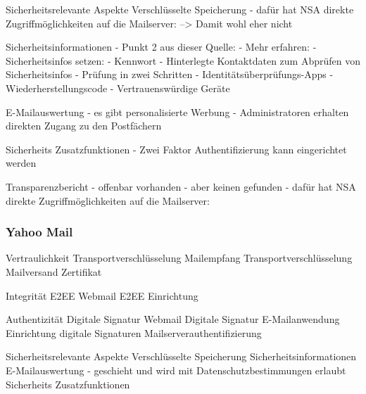 \documentclass  [paper=a4,
				fontsize=12pt,
				listof=totoc,
				bibliography=totoc
				]{scrreprt}
\begin{document}
			Sicherheitsrelevante Aspekte			
			Verschlüsselte Speicherung
			- dafür hat NSA direkte Zugriffmöglichkeiten auf die Mailserver:
			--> Damit wohl eher nicht
			
			Sicherheitsinformationen
			- Punkt 2 aus dieser Quelle:
			- Mehr erfahren:
			- Sicherheitsinfos setzen:
				- Kennwort
				- Hinterlegte Kontaktdaten zum Abprüfen von Sicherheitsinfos
				- Prüfung in zwei Schritten 
				- Identitätsüberprüfungs-Apps
				- Wiederherstellungscode
				- Vertrauenswürdige Geräte 
			
			E-Mailauswertung
			- es gibt personalisierte Werbung
			- Administratoren erhalten direkten Zugang zu den Postfächern
			
			Sicherheits Zusatzfunktionen
			- Zwei Faktor Authentifizierung kann eingerichtet werden
			
			Transparenzbericht
			- offenbar vorhanden
			- aber keinen gefunden
			- dafür hat NSA direkte Zugriffmöglichkeiten auf die Mailserver:
			
			\subsubsection*{Yahoo Mail}
			\label{subsubsec:googlemail}
			
			Vertraulichkeit
			Transportverschlüsselung Mailempfang
			Transportverschlüsselung Mailversand
			Zertifikat
			
			Integrität
			E2EE Webmail
			E2EE Einrichtung
			
			Authentizität
			Digitale Signatur Webmail
			Digitale Signatur E-Mailanwendung
			Einrichtung digitale Signaturen
			Mailserverauthentifizierung
			
			Sicherheitsrelevante Aspekte
			Verschlüsselte Speicherung
			Sicherheitsinformationen
			E-Mailauswertung
			- geschieht und wird mit Datenschutzbestimmungen erlaubt
			Sicherheits Zusatzfunktionen
			
\end{document}
